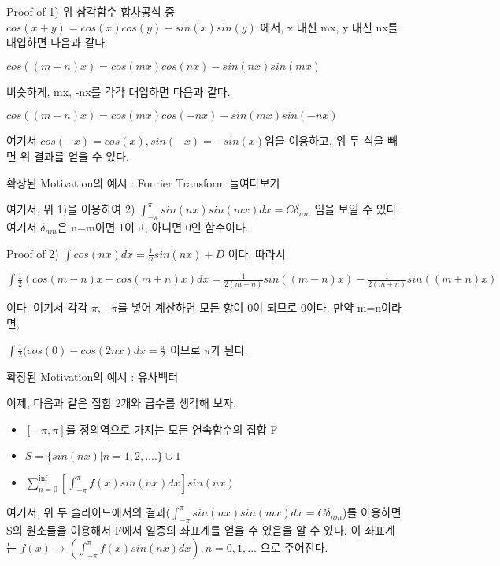 \documentclass{beamer}
\begin{document}
\begin{frame}{Proof of 1)} 
위 삼각함수 합차공식 중 $cos(x+y) = cos(x)cos(y) - sin(x)sin(y)$ 에서, x 대신 mx, y 대신 nx를 대입하면 다음과 같다. 

$cos((m+n)x) = cos(mx)cos(nx) - sin(nx) sin(mx)$ 

비슷하게, mx, -nx를 각각 대입하면 다음과 같다. 

$cos((m-n)x) = cos(mx)cos(-nx) - sin(mx) sin(-nx)$

여기서 $cos(-x) = cos(x), sin(-x) = -sin(x)$임을 이용하고, 위 두 식을 빼면 위 결과를 얻을 수 있다. 

\end{frame}

\begin{frame}{확장된 Motivation의 예시 : Fourier Transform 들여다보기} 

여기서, 위 1)을 이용하여 2) $\int^{\pi}_{-\pi} sin(nx)sin(mx) dx = C\delta_{nm}$ 임을 보일 수 있다. 여기서 $\delta_{nm}$은 n=m이면 1이고, 아니면 0인 함수이다.

\end{frame}

\begin{frame}{Proof of 2)} 
$\int cos(nx) dx = \frac{1}{n} sin(nx) + D$ 이다. 따라서 

$\int \frac{1}{2} (cos(m-n)x - cos(m+n)x) dx = \frac{1}{2(m-n)} sin((m-n)x) - \frac{1}{2(m+n)} sin((m+n)x)$ 

이다. 여기서 각각 $\pi, -\pi$를 넣어 계산하면 모든 항이 0이 되므로 0이다. 만약 m=n이라면, 

$\int\frac{1}{2} (cos(0) - cos(2nx) dx = \frac{x}{2}$ 이므로 $\pi$가 된다. 

\end{frame}

\begin{frame}{확장된 Motivation의 예시 : 유사벡터} 

이제, 다음과 같은 집합 2개와 급수를 생각해 보자. 

\begin{itemize} 
\item $[-\pi, \pi]$를 정의역으로 가지는 모든 연속함수의 집합 F
\item $S = \{sin(nx)|n = 1,2,....\} \cup {1}$ 
\item $\sum^{\inf}_{n=0} [\int^{\pi}_{-\pi} f(x) sin(nx) dx] sin (nx) $
\end{itemize}

여기서, 위 두 슬라이드에서의 결과($\int^{\pi}_{-\pi} sin(nx)sin(mx) dx = C\delta_{nm}$)를 이용하면 S의 원소들을 이용해서 F에서 일종의 좌표계를 얻을 수 있음을 알 수 있다. 이 좌표계는 $f(x) \rightarrow (\int^{\pi}_{-\pi} f(x) sin(nx) dx), n=0,1,...$ 으로 주어진다. 
\end{frame}
\end{document}
